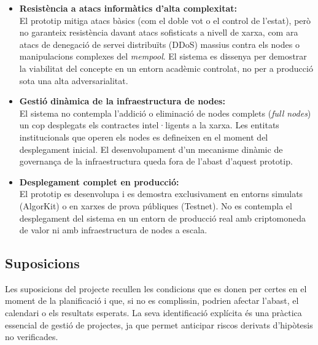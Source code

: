 \begin{itemize}
    \item \textbf{Resistència a atacs informàtics d'alta complexitat:} \\
    El prototip mitiga atacs bàsics (com el doble vot o el control de l'estat), però no garanteix resistència davant atacs sofisticats a nivell de xarxa, com ara atacs de denegació de servei distribuïts (DDoS) massius contra els nodes o manipulacions complexes del \textit{mempool}. El sistema es dissenya per demostrar la viabilitat del concepte en un entorn acadèmic controlat, no per a producció sota una alta adversarialitat.

    \item \textbf{Gestió dinàmica de la infraestructura de nodes:} \\
    El sistema no contempla l'addició o eliminació de nodes complets (\textit{full nodes}) un cop desplegats els contractes intel·ligents a la xarxa. Les entitats institucionals que operen els nodes es defineixen en el moment del desplegament inicial. El desenvolupament d'un mecanisme dinàmic de governança de la infraestructura queda fora de l'abast d'aquest prototip.

    \item \textbf{Desplegament complet en producció:} \\
    El prototip es desenvolupa i es demostra exclusivament en entorns simulats (AlgorKit) o en xarxes de prova públiques (Testnet). No es contempla el desplegament del sistema en un entorn de producció real amb criptomoneda de valor ni amb infraestructura de nodes a escala.
\end{itemize}

\subsection{Suposicions}

Les suposicions del projecte recullen les condicions que es donen per certes en el
moment de la planificació i que, si no es complissin, podrien afectar l'abast, el
calendari o els resultats esperats. 
La seva identificació explícita és una pràctica
essencial de gestió de projectes, ja que permet anticipar riscos derivats d'hipòtesis
no verificades.

